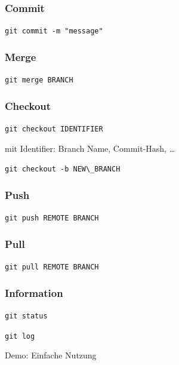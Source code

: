 \documentclass[aspectratio=169]{beamer}
\begin{document}
\begin{frame}
    \frametitle{Commit}
    \begin{center}
        {\Large \lstinline{git commit -m "message"}}
    \end{center}
\end{frame}

\begin{frame}
    \frametitle{Merge}
    \begin{center}
        {\Large \lstinline{git merge BRANCH}}
    \end{center}
\end{frame}

\begin{frame}
    \frametitle{Checkout}
    \begin{center}
        {\Large \lstinline{git checkout IDENTIFIER}}

        mit Identifier: Branch Name, Commit-Hash, \ldots
        \pause

        \vspace{1cm}
    
        {\Large \lstinline{git checkout -b NEW\_BRANCH}}
    \end{center}
\end{frame}


\begin{frame}
    \frametitle{Push}
    \begin{center}
        {\Large \lstinline{git push REMOTE BRANCH}}
    \end{center}
\end{frame}

\begin{frame}
    \frametitle{Pull}
    \begin{center}
        {\Large \lstinline{git pull REMOTE BRANCH}}
    \end{center}
\end{frame}

\begin{frame}
    \frametitle{Information}
    \begin{center}
        {\Large \lstinline{git status}}
        \pause

        \vspace{1cm}

        {\Large \lstinline{git log}}
    \end{center}
\end{frame}

\begin{frame}
    \Huge{Demo: Einfache Nutzung} 
\end{frame}
\end{document}
